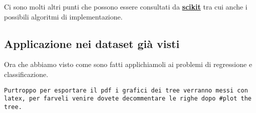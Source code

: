 \documentclass[11pt]{article}
\begin{document}
Ci sono molti altri punti che possono essere consultati da
\textbf{\href{https://scikit-learn.org/stable/modules/tree.html}{scikit}}
tra cui anche i possibili algoritmi di implementazione.

    \hypertarget{applicazione-nei-dataset-giuxe0-visti}{%
\subsection{Applicazione nei dataset già
visti}\label{applicazione-nei-dataset-giuxe0-visti}}

Ora che abbiamo visto come sono fatti applichiamoli ai problemi di
regressione e classificazione.

\begin{verbatim}
Purtroppo per esportare il pdf i grafici dei tree verranno messi con latex, per farveli venire dovete decommentare le righe dopo #plot the tree.
\end{verbatim}
\end{document}
